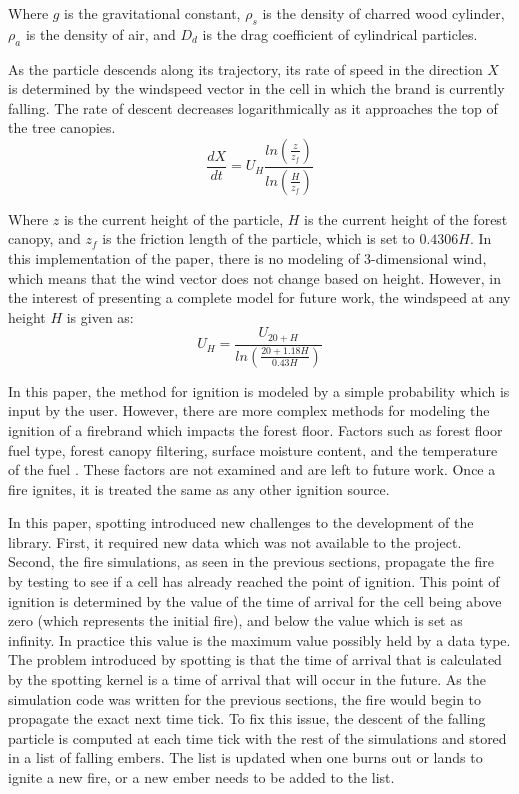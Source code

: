 Where $g$ is the gravitational constant, $\rho_s$ is the density of charred wood cylinder, $\rho_a$ is the density of air, and $D_d$ is the drag coefficient of cylindrical particles. 

As the particle descends along its trajectory, its rate of speed in the direction $X$ is determined by the windspeed vector in the cell in which the brand is currently falling. The rate of descent decreases logarithmically as it approaches the top of the tree canopies. 
\begin{equation}
\frac{dX}{dt} = U_H\frac{ln(\frac{z}{z_f})}{ln(\frac{H}{z_f})}
\end{equation}

Where $z$ is the current height of the particle, $H$ is the current height of the forest canopy, and $z_f$ is the friction length of the particle, which is set to $0.4306H$. In this implementation of the paper, there is no modeling of 3-dimensional wind, which means that the wind vector does not change based on height. However, in the interest of presenting a complete model for future work, the windspeed at any height $H$ is given as: 
\begin{equation}
U_H = \frac{U_{20+H}}{ln(\frac{20+1.18H}{0.43H})}
\end{equation}

In this paper, the method for ignition is modeled by a simple probability which is input by the user. However, there are more complex methods for modeling the ignition of a firebrand which impacts the forest floor. Factors such as forest floor fuel type, forest canopy filtering, surface moisture content, and the temperature of the fuel \cite{bradshaw1984,blackmarr1972,bunting1974}. These factors are not examined and are left to future work. Once a fire ignites, it is treated the same as any other ignition source. 

In this paper, spotting introduced new challenges to the development of the library. First, it required new data which was not available to the project. Second, the fire simulations, as seen in the previous sections, propagate the fire by testing to see if a cell has already reached the point of ignition. This point of ignition is determined by the value of the time of arrival for the cell being above zero (which represents the initial fire), and below the value which is set as infinity. In practice this value is the maximum value possibly held by a data type. The problem introduced by spotting is that the time of arrival that is calculated by the spotting kernel is a time of arrival that will occur in the future. As the simulation code was written for the previous sections, the fire would begin to propagate the exact next time tick. To fix this issue, the descent of the falling particle is computed at each time tick with the rest of the simulations and stored in a list of falling embers. The list is updated when one burns out or lands to ignite a new fire, or a new ember needs to be added to the list.  


